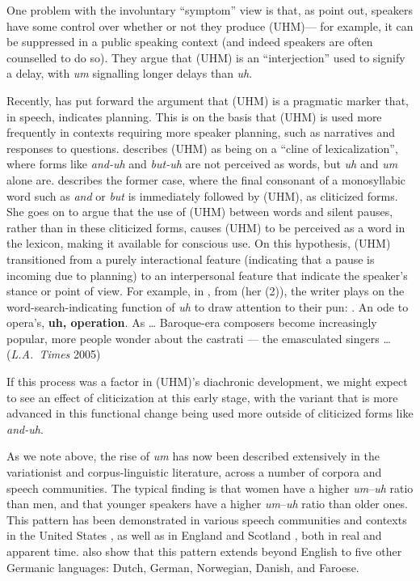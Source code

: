 \documentclass[11pt]{article}
\begin{document}
One problem with the involuntary ``symptom'' view is that, as
\textcite{clarkfoxtree2002} point out, speakers have some control over whether
or not they produce (UHM)---%
for example, it can be suppressed in a public speaking context (and indeed
speakers are often counselled to do so).
They argue that (UHM) is an ``interjection'' used to signify a delay, with
\emph{um} signalling longer delays than \emph{uh}.

Recently, \textcite{tottie2016} has put forward the argument that
(UHM) is a pragmatic marker that, in speech, indicates planning.
This is on the basis that (UHM) is used more frequently in contexts requiring
more speaker planning, such as narratives and responses to questions.
\textcite{tottie2017} describes (UHM) as being on a ``cline of lexicalization'',
where forms like \emph{and-uh} and \emph{but-uh} are not perceived as words, but
\emph{uh} and \emph{um} alone are.
\textcite[21--22]{tottie2017} describes the former case, where the final
consonant of a monosyllabic word such as \emph{and} or \emph{but} is immediately
followed by (UHM), as cliticized forms.
She goes on to argue that the use of (UHM) between words and silent pauses,
rather than in these cliticized forms, causes (UHM) to be perceived as a word in
the lexicon, making it available for conscious use.
On this hypothesis, (UHM) transitioned from a purely interactional feature
(indicating that a pause is incoming due to planning) to an interpersonal
feature that indicate the speaker's stance or point of view.
For example, in \Next, from \textcite{tottie2017} (her (2)), the writer plays on
the word-search-indicating function of \emph{uh} to draw attention to their pun:
\ex. An ode to opera's, \textbf{uh, operation}. As \ldots{} Baroque-era
composers become increasingly popular, more people wonder about the castrati ---
the emasculated singers \ldots{} (\emph{L.A.~Times} 2005)

If this process was a factor in (UHM)'s diachronic development, we might expect
to see an effect of cliticization at this early stage, with the variant that is
more advanced in this functional change being used more outside of cliticized
forms like \emph{and-uh}.

As we note above, the rise of \emph{um} has now been described extensively in
the variationist and corpus-linguistic literature, across a number of corpora
and speech communities.
The typical finding is that women have a higher \emph{um}--\emph{uh} ratio than
men, and that younger speakers have a higher \emph{um}--\emph{uh} ratio than
older ones.
This pattern has been demonstrated in various speech communities and contexts in
the United States \parencite{acton2011, fruehwald2016, wielingetal2016,
lasernaetal2014}, as well as in England and Scotland \parencite{tottie2011,
wielingetal2016}, both in real and apparent time.
\textcite{wielingetal2016} also show that this pattern extends beyond English to
five other Germanic languages: Dutch, German, Norwegian, Danish, and Faroese.
\end{document}
